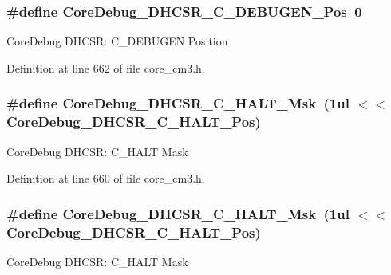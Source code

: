 \subsubsection[{\texorpdfstring{Core\+Debug\+\_\+\+D\+H\+C\+S\+R\+\_\+\+C\+\_\+\+D\+E\+B\+U\+G\+E\+N\+\_\+\+Pos}{CoreDebug_DHCSR_C_DEBUGEN_Pos}}]{\setlength{\rightskip}{0pt plus 5cm}\#define Core\+Debug\+\_\+\+D\+H\+C\+S\+R\+\_\+\+C\+\_\+\+D\+E\+B\+U\+G\+E\+N\+\_\+\+Pos~0}\hypertarget{group___c_m_s_i_s___c_m3___core_debug_gab557abb5b172b74d2cf44efb9d824e4e}{}\label{group___c_m_s_i_s___c_m3___core_debug_gab557abb5b172b74d2cf44efb9d824e4e}
Core\+Debug D\+H\+C\+SR\+: C\+\_\+\+D\+E\+B\+U\+G\+EN Position 

Definition at line 662 of file core\+\_\+cm3.\+h.

\subsubsection[{\texorpdfstring{Core\+Debug\+\_\+\+D\+H\+C\+S\+R\+\_\+\+C\+\_\+\+H\+A\+L\+T\+\_\+\+Msk}{CoreDebug_DHCSR_C_HALT_Msk}}]{\setlength{\rightskip}{0pt plus 5cm}\#define Core\+Debug\+\_\+\+D\+H\+C\+S\+R\+\_\+\+C\+\_\+\+H\+A\+L\+T\+\_\+\+Msk~(1ul $<$$<$ Core\+Debug\+\_\+\+D\+H\+C\+S\+R\+\_\+\+C\+\_\+\+H\+A\+L\+T\+\_\+\+Pos)}\hypertarget{group___c_m_s_i_s___c_m3___core_debug_ga1d905a3aa594eb2e8bb78bcc4da05b3f}{}\label{group___c_m_s_i_s___c_m3___core_debug_ga1d905a3aa594eb2e8bb78bcc4da05b3f}
Core\+Debug D\+H\+C\+SR\+: C\+\_\+\+H\+A\+LT Mask 

Definition at line 660 of file core\+\_\+cm3.\+h.

\subsubsection[{\texorpdfstring{Core\+Debug\+\_\+\+D\+H\+C\+S\+R\+\_\+\+C\+\_\+\+H\+A\+L\+T\+\_\+\+Msk}{CoreDebug_DHCSR_C_HALT_Msk}}]{\setlength{\rightskip}{0pt plus 5cm}\#define Core\+Debug\+\_\+\+D\+H\+C\+S\+R\+\_\+\+C\+\_\+\+H\+A\+L\+T\+\_\+\+Msk~(1ul $<$$<$ Core\+Debug\+\_\+\+D\+H\+C\+S\+R\+\_\+\+C\+\_\+\+H\+A\+L\+T\+\_\+\+Pos)}\hypertarget{group___c_m_s_i_s___c_m3___core_debug_ga1d905a3aa594eb2e8bb78bcc4da05b3f}{}\label{group___c_m_s_i_s___c_m3___core_debug_ga1d905a3aa594eb2e8bb78bcc4da05b3f}
Core\+Debug D\+H\+C\+SR\+: C\+\_\+\+H\+A\+LT Mask 

